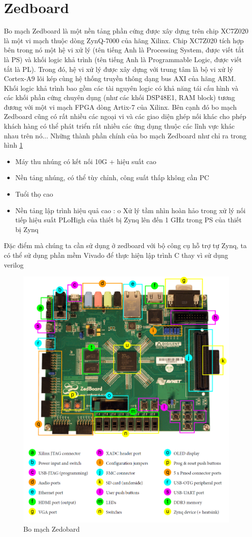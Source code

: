 \documentclass[a4paper]{report}
\begin{document}
\section{Zedboard}
Bo mạch Zedboard là một nền tảng phần cứng được xây dựng trên chip XC7Z020 là một vi mạch thuộc dòng ZynQ-7000 của hãng Xilinx. Chip XC7Z020 tích hợp bên trong nó một hệ vi xử lý (tên tiếng Anh là Processing System, được viết tắt là PS) và khối logic khả trình (tên tiếng Anh là Programmable Logic, được viết tắt là PL). Trong đó, hệ vi xử lý được xây dựng với trung tâm là bộ vi xử lý Cortex-A9 lõi kép cùng hệ thống truyền thông dạng bus AXI của hãng ARM. Khối logic khả trình bao gồm các tài nguyên logic có khả năng tái cấu hình và các khối phần cứng chuyên dụng (như các khối DSP48E1, RAM block) tương đương với một vi mạch FPGA dòng Artix-7 của Xilinx.  Bên cạnh đó bo mạch Zedboard cũng có rất nhiều các ngoại vi và các giao diện ghép nối khác cho phép khách hàng có thể phát triển rất nhiều các ứng dụng thuộc các lĩnh vực khác nhau trên nó..\cite{zedboard}. Những thành phần chính của bo mạch Zedboard như chỉ ra trong hình \ref{fig:zedboard}
\begin{itemize}
\item Máy thu nhúng có kết nối 10G + hiệu suất cao 
\item Nền tảng nhúng, có thể tùy chỉnh, công suất thấp không cần PC 
\item Tuổi thọ cao
\item Nền tảng lập trình hiệu quả cao : o Xử lý tầm nhìn hoàn hảo trong xử lý nối tiếp hiệu suất PLoHigh của thiết bị Zynq lên đến 1 GHz trong PS của thiết bị Zynq
\end{itemize}
Đặc điểm mà chúng ta cần sử dụng ở zedboard với bộ công cụ hỗ trợ tự Zynq, ta có thể sử dụng phần mềm Vivado để thực hiện lập trình C thay vì sử dụng verilog 
\begin{figure}[H]
\centering
\includegraphics[width=.7\textwidth]{../images/fig/zedboard.png}
\caption{Bo mạch Zedobard}
\label{fig:zedboard}
\end{figure}
\end{document}
